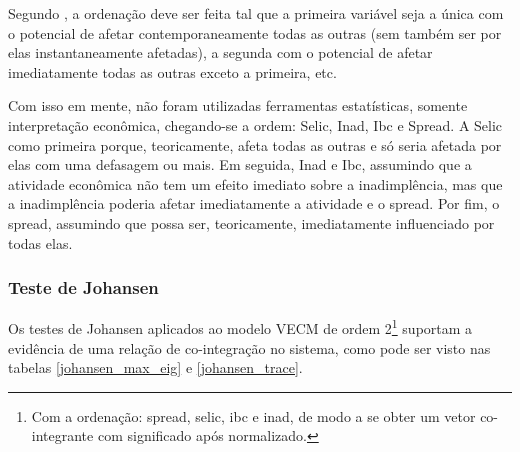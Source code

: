 \documentclass[a4paper,
               article,
               12pt,
               openany,
               oneside,
               english,
               brazil]{abntex2}
\numberwithin{equation}{section}
\begin{document}
    Segundo \textcite[61]{lutkepool}, a ordenação deve ser feita tal que a primeira variável seja a única com o potencial de afetar contemporaneamente todas as outras (sem também ser por elas instantaneamente afetadas), a segunda com o potencial de afetar imediatamente todas as outras exceto a primeira, etc.

    Com isso em mente, não foram utilizadas ferramentas estatísticas, somente interpretação econômica, chegando-se a ordem: Selic, Inad, Ibc e Spread. A Selic como primeira porque, teoricamente, afeta todas as outras e só seria afetada por elas com uma defasagem ou mais. Em seguida, Inad e Ibc, assumindo que a atividade econômica não tem um efeito imediato sobre a inadimplência, mas que a inadimplência poderia afetar imediatamente a atividade e o spread. Por fim, o spread, assumindo que possa ser, teoricamente, imediatamente influenciado por todas elas.

    \subsubsection{Teste de Johansen}

    Os testes de Johansen aplicados ao modelo VECM de ordem 2\footnote{Com a ordenação: spread, selic, ibc e inad, de modo a se obter um vetor co-integrante com significado após normalizado.} suportam a evidência de uma relação de co-integração no sistema, como pode ser visto nas tabelas \autoref{johansen_max_eig} e \autoref{johansen_trace}.
\end{document}
